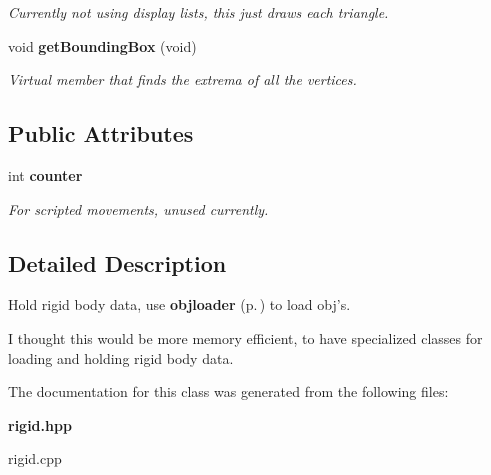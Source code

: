 \begin{CompactItemize}
\begin{CompactList}\small\item\em Currently not using display lists, this just draws each triangle.\item\end{CompactList}\item 
{}
void {\bf get\-Bounding\-Box} (void)\label{classrigid_a7}

\begin{CompactList}\small\item\em Virtual member that finds the extrema of all the vertices.\item\end{CompactList}\end{CompactItemize}
\subsection*{Public Attributes}
\begin{CompactItemize}
\item 
{}
int {\bf counter}\label{classrigid_m0}

\begin{CompactList}\small\item\em For scripted movements, unused currently.\item\end{CompactList}\end{CompactItemize}


\subsection{Detailed Description}
Hold rigid body data, use {\bf objloader} {\rm (p.\,\pageref{classobjloader})} to load obj's.

I thought this would be more memory efficient, to have specialized classes for loading and holding rigid body data. 



The documentation for this class was generated from the following files:\begin{CompactItemize}
\item 
{\bf rigid.hpp}\item 
rigid.cpp\end{CompactItemize}
